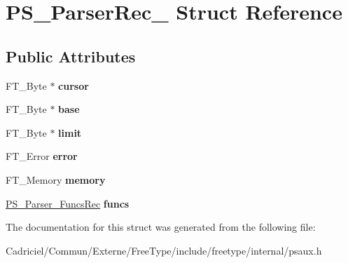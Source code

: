 \hypertarget{struct_p_s___parser_rec__}{\section{P\-S\-\_\-\-Parser\-Rec\-\_\- Struct Reference}
\label{struct_p_s___parser_rec__}
}
\subsection*{Public Attributes}
\begin{DoxyCompactItemize}
\item 
\hypertarget{struct_p_s___parser_rec___a6ed189bc25c03814bdafad63819ddfe7}{F\-T\-\_\-\-Byte $\ast$ {\bfseries cursor}}\label{struct_p_s___parser_rec___a6ed189bc25c03814bdafad63819ddfe7}

\item 
\hypertarget{struct_p_s___parser_rec___a30528f6a9caffce2fd44ef2d5a38e5bd}{F\-T\-\_\-\-Byte $\ast$ {\bfseries base}}\label{struct_p_s___parser_rec___a30528f6a9caffce2fd44ef2d5a38e5bd}

\item 
\hypertarget{struct_p_s___parser_rec___af3310795fd73530036fb32ec4385ea3d}{F\-T\-\_\-\-Byte $\ast$ {\bfseries limit}}\label{struct_p_s___parser_rec___af3310795fd73530036fb32ec4385ea3d}

\item 
\hypertarget{struct_p_s___parser_rec___a7a1432cb4d8bb603663f1258224c8ec4}{F\-T\-\_\-\-Error {\bfseries error}}\label{struct_p_s___parser_rec___a7a1432cb4d8bb603663f1258224c8ec4}

\item 
\hypertarget{struct_p_s___parser_rec___a3e2206deb6c0d73f51c8c71d5db1db1f}{F\-T\-\_\-\-Memory {\bfseries memory}}\label{struct_p_s___parser_rec___a3e2206deb6c0d73f51c8c71d5db1db1f}

\item 
\hypertarget{struct_p_s___parser_rec___a450031fd9e77e55bf424dc64a8d2659d}{\hyperlink{struct_p_s___parser___funcs_rec__}{P\-S\-\_\-\-Parser\-\_\-\-Funcs\-Rec} {\bfseries funcs}}\label{struct_p_s___parser_rec___a450031fd9e77e55bf424dc64a8d2659d}

\end{DoxyCompactItemize}


The documentation for this struct was generated from the following file\-:\begin{DoxyCompactItemize}
\item 
Cadriciel/\-Commun/\-Externe/\-Free\-Type/include/freetype/internal/psaux.\-h\end{DoxyCompactItemize}
